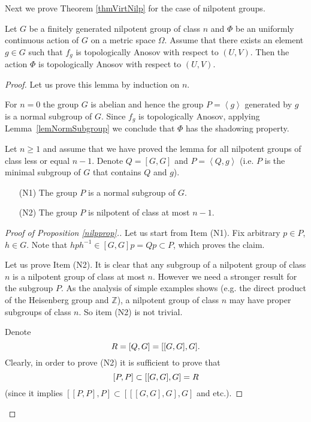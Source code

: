 Next we prove Theorem \ref{thmVirtNilp} for the case of nilpotent groups.
\begin{lem}\label{lemNilp}
Let $G$ be a finitely generated nilpotent group of class $n$ and $\Phi$ be an uniformly continuous action of $G$ on a metric space $\Omega$. Assume that there exists an element $g \in G$ such that $f_g$ is topologically Anosov with respect to $(U, V)$.
Then the action $\Phi$ is topologically Anosov with respect to $(U, V)$.
\end{lem}
\begin{proof}
Let us prove this lemma by induction on $n$.

For $n = 0$ the group $G$ is abelian and hence the group $P = \left<g\right>$ generated by $g$ is a normal subgroup of $G$. Since $f_g$ is topologically Anosov, applying Lemma~\ref{lemNormSubgroup} we conclude that $\Phi$ has the shadowing property.

Let $n \geq 1$ and assume that we have proved the lemma for all nilpotent groups of class less or equal $n-1$. Denote $Q = [G, G]$ and $P = \left< Q, g \right>$ (i.e. $P$ is the minimal subgroup of $G$ that contains $Q$ and $g$). 
\begin{prp}
\label{nilpprop}
\begin{itemize}
  \item[(N1)] The group $P$ is a normal subgroup of $G$.
    \item[(N2)] The group $P$ is nilpotent of class at most $n-1$.
\end{itemize}
\end{prp}

\begin{proof}[Proof of Proposition \ref{nilpprop}.]
Let us start from Item (N1). Fix arbitrary $p\in P$, $h\in G$. Note that $hph^{-1}\in [G,G]p=Qp\subset P$, which proves the claim.

Let us prove Item (N2).
It is clear that any subgroup of a nilpotent group of class $n$ is a nilpotent group of class at most $n$. However we need a stronger result for the subgroup $P$. As the analysis of simple examples shows (e.g. the direct product of the Heisenberg group and $\mathbb{Z}$), a nilpotent group of class $n$ may have proper subgroups of class $n$. So item (N2) is not trivial.

Denote
\begin{equation}\notag
\label{qdef}
R = [Q,G]=[[G,G],G].
\end{equation}
Clearly, in order to prove (N2) it is sufficient to prove that
\begin{equation}\notag
\label{tempgoal}
[P,P]\subset [[G,G],G] = R
\end{equation}
(since it implies $[[P,P],P]\subset [[[G,G],G],G]$ and etc.).


\end{proof}
\end{proof}
